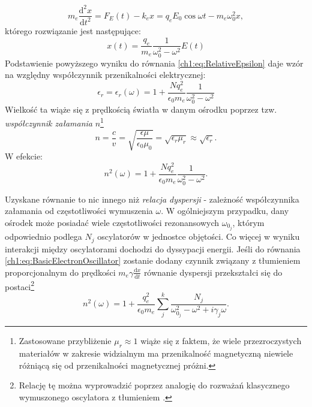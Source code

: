 \begin{equation}
m_e\frac{\mathrm{d^2}x}{\mathrm{d}t^2} = F_E(t) - k_ex = q_eE_0\cos\omega t - m_e\omega_0^2x,
\label{ch1:eq:BasicElectronOscillator}
\end{equation}
którego rozwiązanie jest następujące:
\begin{equation}
x(t) = \frac{q_e}{m_e}\frac{1}{\omega_0^2 - \omega^2 }E(t)
\end{equation}
Podstawienie powyższego wyniku do równania \eqref{ch1:eq:RelativeEpsilon} daje wzór na względny współczynnik przenikalności elektrycznej:
\begin{equation}
\epsilon_r = \epsilon_r(\omega) = 1 + \frac{Nq_e^2}{\epsilon_0m_e}\frac{1}{\omega_0^2 - \omega^2}
\label{ch1:eq:GeneralRelativeEpsilon}
\end{equation}
Wielkość ta wiąże się z prędkością światła w danym ośrodku poprzez tzw. \textit{współczynnik załamania} $n$\footnote{Zastosowane przybliżenie $\mu_r\approx 1$ wiąże się z faktem, że wiele przezroczystych materiałów w zakresie widzialnym ma przenikalność magnetyczną niewiele różniącą się od przenikalności magnetycznej próżni.}
\begin{equation}
n = \frac{c}{v} = \sqrt{\frac{\epsilon\mu}{\epsilon_0\mu_0}} = \sqrt{\epsilon_r\mu_r}\approx\sqrt{\epsilon_r}.
\end{equation}
W efekcie:
\begin{equation}
n^2(\omega) = 1 + \frac{Nq_e^2}{\epsilon_0m_e}\frac{1}{\omega_0^2 - \omega^2}.
\label{ch1:eq:RefractionCoeff}
\end{equation}

Uzyskane równanie to nic innego niż \textit{relacja dyspersji} - zależność współczynnika załamania od częstotliwości wymuszenia $\omega$. W ogólniejszym przypadku, dany ośrodek może posiadać wiele częstotliwości rezonansowych $\omega_{0_j}$, którym odpowiednio podlega $N_j$ oscylatorów w jednostce objętości. Co więcej w wyniku interakcji między oscylatorami dochodzi do dyssypacji energii. Jeśli do równania \eqref{ch1:eq:BasicElectronOscillator} zostanie dodany czynnik związany z tłumieniem proporcjonalnym do prędkości $m_e\gamma\frac{\mathrm{d}x}{\mathrm{d}t}$ równanie dyspersji przekształci się do postaci\footnote{Relację tę można wyprowadzić poprzez analogię do rozważań klasycznego wymuszonego oscylatora z tłumieniem \cite{RUBINOWICZ_KROLIKOWSKI}.}
\begin{equation}
n^2(\omega) = 1 + \frac{q_e^2}{\epsilon_0m_e}\sum_j^k\frac{N_j}{\omega_{0_j}^2 - \omega^2 + i\gamma_j\omega}.
\label{ch1:eq:GeneralRefractionCoeff}
\end{equation}

